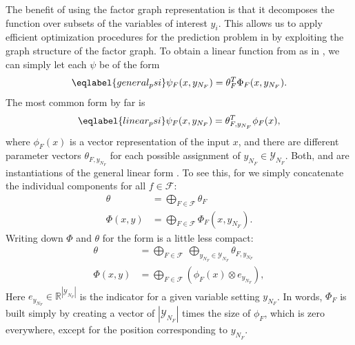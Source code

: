 The benefit of using the factor graph representation is that it decomposes the
function over subsets of the variables of interest $y_i$. This allows us to apply
efficient optimization procedures for the prediction problem in
 by exploiting the graph structure of the factor graph.
%
To obtain a linear function from
 as in , we can simply let each $\psi$ be of the form
\begin{equation}\eqlabel{general_psi}
    \psi_F(x, y_{N_F}) = \theta_F^T \Phi_F(x, y_{N_F}).
\end{equation}
The most common form by far is 
\begin{equation}\eqlabel{linear_psi}
    \psi_F(x, y_{N_F}) = \theta_{F, y_{N_F}}^T \phi_F(x),
\end{equation}
where $\phi_F(x)$ is a vector representation of the input $x$, and there are
different parameter vectors $\theta_{F, y_{N_F}}$ for each possible assignment
of $y_{N_F} \in \mathcal{Y}_{N_F}$.
%
Both,  and  are instantiations of the general
linear form . To see this, for  we simply
concatenate the individual components for all $f \in \mathcal{F}$:
\begin{align}
    \theta &= \bigoplus_{F \in \mathcal{F}} \theta_F\\
    \Phi(x, y) &= \bigoplus_{F \in \mathcal{F}} \Phi_F(x, y_{N_F}).
\end{align}
Writing down $\Phi$ and $\theta$ for the form  is a little less compact:
\begin{align}
    \theta &= \bigoplus_{F \in \mathcal{F}}\ \bigoplus_{y_{N_F} \in \mathcal{Y}_{N_F}} \theta_{F, y_{N_F}}\\
    \Phi(x, y) &= \bigoplus_{F \in \mathcal{F}} \left (\phi_F(x) \otimes e_{y_{N_F}} \right ),
\end{align}
Here $e_{y_{N_F}} \in \mathbb{R}^{|\mathcal{Y}_{N_F}|}$ is the indicator for a
given variable setting $y_{N_F}$.
In words, $\Phi_F$ is built simply by creating a vector of
$|\mathcal{Y}_{N_F}|$ times the size of $\phi_F$, which is zero everywhere,
except for the position corresponding to $y_{N_F}$. %

